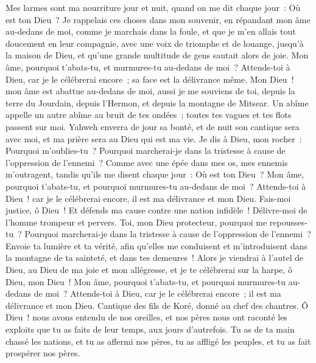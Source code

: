 \begin{multicols}{2}
Mes larmes sont ma nourriture jour et nuit, quand on me dit chaque jour~: Où est ton Dieu~?
Je rappelais ces choses dans mon souvenir, en répandant mon âme au-dedans de moi, comme je marchais dans la foule, et que je m'en allais tout doucement en leur compagnie, avec une voix de triomphe et de louange, jusqu'à la maison de Dieu, et qu'une grande multitude de gens sautait alors de joie.
Mon âme, pourquoi t'abats-tu, et murmures-tu au-dedans de moi~? Attends-toi à Dieu, car je le célébrerai encore~; sa face est la délivrance même.
Mon Dieu~! mon âme est abattue au-dedans de moi, aussi je me souviens de toi, depuis la terre du Jourdain, depuis l'Hermon, et depuis la montagne de Mitsear.
Un abîme appelle un autre abîme au bruit de tes ondées~; toutes tes vagues et tes flots passent sur moi.
Yahweh enverra de jour sa bonté, et de nuit son cantique sera avec moi, et ma prière sera au Dieu qui est ma vie.
Je dis à Dieu, mon rocher~: Pourquoi m'oublies-tu~? Pourquoi marcherai-je dans la tristesse à cause de l'oppression de l'ennemi~?
Comme avec une épée dans mes os, mes ennemis m'outragent, tandis qu'ils me disent chaque jour~: Où est ton Dieu~?
Mon âme, pourquoi t'abats-tu, et pourquoi murmures-tu au-dedans de moi~? Attends-toi à Dieu~! car je le célébrerai encore, il est ma délivrance et mon Dieu.
\VerseOne{}Fais-moi justice, ô Dieu~! Et défends ma cause contre une nation infidèle~! Délivre-moi de l'homme trompeur et pervers.
Toi, mon Dieu protecteur, pourquoi me repousses-tu~? Pourquoi marcherai-je dans la tristesse à cause de l'oppression de l'ennemi~?
Envoie ta lumière et ta vérité, afin qu'elles me conduisent et m'introduisent dans la montagne de ta sainteté, et dans tes demeures~!
Alors je viendrai à l'autel de Dieu, au Dieu de ma joie et mon allégresse, et je te célébrerai sur la harpe, ô Dieu, mon Dieu~!
Mon âme, pourquoi t'abats-tu, et pourquoi murmures-tu au-dedans de moi~? Attends-toi à Dieu, car je le célébrerai encore~; il est ma délivrance et mon Dieu.
\VerseOne{}Cantique des fils de Koré, donné au chef des chantres.
Ô Dieu~! nous avons entendu de nos oreilles, et nos pères nous ont raconté les exploits que tu as faits de leur temps, aux jours d'autrefois.
Tu as de ta main chassé les nations, et tu as affermi nos pères, tu as affligé les peuples, et tu as fait prospérer nos pères.

\end{multicols}
